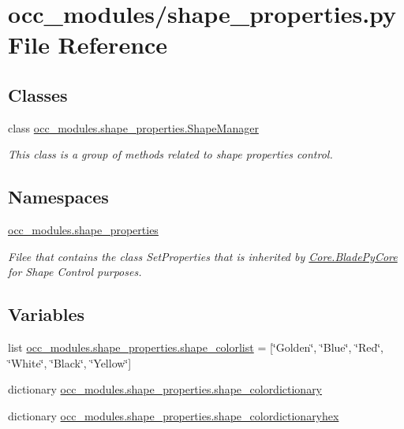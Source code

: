\hypertarget{a00023}{}\section{occ\+\_\+modules/shape\+\_\+properties.py File Reference}
\label{a00023}
\subsection*{Classes}
\begin{DoxyCompactItemize}
\item 
class \hyperlink{a00094}{occ\+\_\+modules.\+shape\+\_\+properties.\+Shape\+Manager}
\begin{DoxyCompactList}\small\item\em This class is a group of methods related to shape properties control. \end{DoxyCompactList}\end{DoxyCompactItemize}
\subsection*{Namespaces}
\begin{DoxyCompactItemize}
\item 
 \hyperlink{a00056}{occ\+\_\+modules.\+shape\+\_\+properties}
\begin{DoxyCompactList}\small\item\em Filee that contains the class Set\+Properties that is inherited by \hyperlink{a00078}{Core.\+Blade\+Py\+Core} for Shape Control purposes. \end{DoxyCompactList}\end{DoxyCompactItemize}
\subsection*{Variables}
\begin{DoxyCompactItemize}
\item 
list \hyperlink{a00056_ad2dbba5d4e06c2ef16d74722e24325bb}{occ\+\_\+modules.\+shape\+\_\+properties.\+shape\+\_\+colorlist} = \mbox{[}\char`\"{}Golden\char`\"{}, \char`\"{}Blue\char`\"{}, \char`\"{}Red\char`\"{}, \char`\"{}White\char`\"{}, \char`\"{}Black\char`\"{}, \char`\"{}Yellow\char`\"{}\mbox{]}
\item 
dictionary \hyperlink{a00056_a2435b9798b2353ff84c79fe909cc39fd}{occ\+\_\+modules.\+shape\+\_\+properties.\+shape\+\_\+colordictionary}
\item 
dictionary \hyperlink{a00056_a8deb972f03c3f2b89ddc04b0006dd0b2}{occ\+\_\+modules.\+shape\+\_\+properties.\+shape\+\_\+colordictionaryhex}
\end{DoxyCompactItemize}
